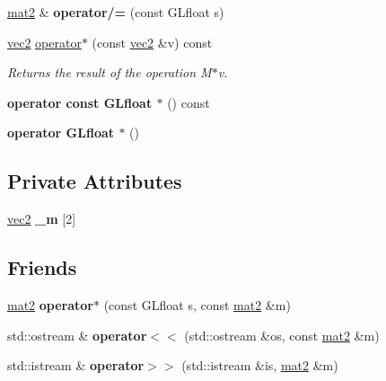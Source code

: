 \begin{DoxyCompactItemize}
\item 
\hypertarget{class_angel_1_1mat2_ad72c91bf3c2d1ea79a0ee67f50b3dda6}{\hyperlink{class_angel_1_1mat2}{mat2} \& {\bfseries operator/=} (const G\-Lfloat s)}\label{class_angel_1_1mat2_ad72c91bf3c2d1ea79a0ee67f50b3dda6}

\item 
\hyperlink{struct_angel_1_1vec2}{vec2} \hyperlink{class_angel_1_1mat2_a1be53f556f8dd39cc2a95c0168319129}{operator$\ast$} (const \hyperlink{struct_angel_1_1vec2}{vec2} \&v) const 
\begin{DoxyCompactList}\small\item\em Returns the result of the operation M$\ast$v. \end{DoxyCompactList}\item 
\hypertarget{class_angel_1_1mat2_a413f7a4b589ff434f6a4f3a2bf2e3238}{{\bfseries operator const G\-Lfloat $\ast$} () const }\label{class_angel_1_1mat2_a413f7a4b589ff434f6a4f3a2bf2e3238}

\item 
\hypertarget{class_angel_1_1mat2_a1964937b0ce62e819edb23c8eeee9ddc}{{\bfseries operator G\-Lfloat $\ast$} ()}\label{class_angel_1_1mat2_a1964937b0ce62e819edb23c8eeee9ddc}

\end{DoxyCompactItemize}
\subsection*{Private Attributes}
\begin{DoxyCompactItemize}
\item 
\hypertarget{class_angel_1_1mat2_a04ca47b08412fa9c9ed5067843df53e9}{\hyperlink{struct_angel_1_1vec2}{vec2} {\bfseries \-\_\-m} \mbox{[}2\mbox{]}}\label{class_angel_1_1mat2_a04ca47b08412fa9c9ed5067843df53e9}

\end{DoxyCompactItemize}
\subsection*{Friends}
\begin{DoxyCompactItemize}
\item 
\hypertarget{class_angel_1_1mat2_a93186aa02a28897515079acad73bd0dd}{\hyperlink{class_angel_1_1mat2}{mat2} {\bfseries operator$\ast$} (const G\-Lfloat s, const \hyperlink{class_angel_1_1mat2}{mat2} \&m)}\label{class_angel_1_1mat2_a93186aa02a28897515079acad73bd0dd}

\item 
\hypertarget{class_angel_1_1mat2_a264412852cfa06a39b477d08b390d8e8}{std\-::ostream \& {\bfseries operator$<$$<$} (std\-::ostream \&os, const \hyperlink{class_angel_1_1mat2}{mat2} \&m)}\label{class_angel_1_1mat2_a264412852cfa06a39b477d08b390d8e8}

\item 
\hypertarget{class_angel_1_1mat2_a43f4ce08af11ef35f85de6c785b093a8}{std\-::istream \& {\bfseries operator$>$$>$} (std\-::istream \&is, \hyperlink{class_angel_1_1mat2}{mat2} \&m)}\label{class_angel_1_1mat2_a43f4ce08af11ef35f85de6c785b093a8}

\end{DoxyCompactItemize}



